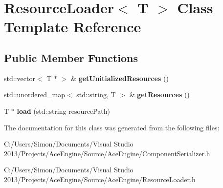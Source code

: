 \hypertarget{class_resource_loader}{}\section{Resource\+Loader$<$ T $>$ Class Template Reference}
\label{class_resource_loader}
\subsection*{Public Member Functions}
\begin{DoxyCompactItemize}
\item 
\hypertarget{class_resource_loader_accf0b5f190bc90853aa94e5037bdf9fc}{}std\+::vector$<$ T $\ast$ $>$ \& {\bfseries get\+Unitialized\+Resources} ()\label{class_resource_loader_accf0b5f190bc90853aa94e5037bdf9fc}

\item 
\hypertarget{class_resource_loader_ad2eb3670def91713850979611dc9e1c6}{}std\+::unordered\+\_\+map$<$ std\+::string, T $>$ \& {\bfseries get\+Resources} ()\label{class_resource_loader_ad2eb3670def91713850979611dc9e1c6}

\item 
\hypertarget{class_resource_loader_af24b628b1ce7a778098de29506f377bf}{}T $\ast$ {\bfseries load} (std\+::string resource\+Path)\label{class_resource_loader_af24b628b1ce7a778098de29506f377bf}

\end{DoxyCompactItemize}


The documentation for this class was generated from the following files\+:\begin{DoxyCompactItemize}
\item 
C\+:/\+Users/\+Simon/\+Documents/\+Visual Studio 2013/\+Projects/\+Ace\+Engine/\+Source/\+Ace\+Engine/Component\+Serializer.\+h\item 
C\+:/\+Users/\+Simon/\+Documents/\+Visual Studio 2013/\+Projects/\+Ace\+Engine/\+Source/\+Ace\+Engine/Resource\+Loader.\+h\end{DoxyCompactItemize}
